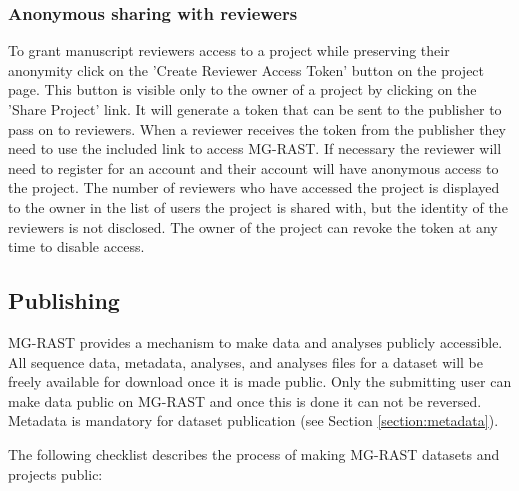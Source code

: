 \documentclass[12pt,fullpage]{report}
\begin{document}
\subsubsection*{Anonymous sharing with reviewers}
\label{section:reviewer_sharing}
To grant manuscript reviewers access to a project while preserving their anonymity click on the 'Create Reviewer Access Token' button on the project page. This button is visible only to the owner of a project by clicking on the 'Share Project' link. It will generate a token that can be sent to the publisher to pass on to reviewers. When a reviewer receives the token from the publisher they need to use the included link to access MG-RAST. If necessary the reviewer will need to register for an account and their account will have anonymous access to the project. The number of reviewers who have accessed the project is displayed to the owner in the list of users the project is shared with, but the identity of the reviewers is not disclosed. The owner of the project can revoke the token at any time to disable access.
\subsection*{Publishing}
\label{section:publishing}
MG-RAST provides a mechanism to make data and analyses publicly accessible. All sequence data, metadata, analyses, and analyses files for a dataset will be freely available for download once it is made public. Only the submitting user can make data public on MG-RAST and once this is done it can not be reversed. Metadata is mandatory for dataset publication (see Section \ref{section:metadata}).

The following checklist describes the process of making MG-RAST datasets and projects public:
\end{document}
